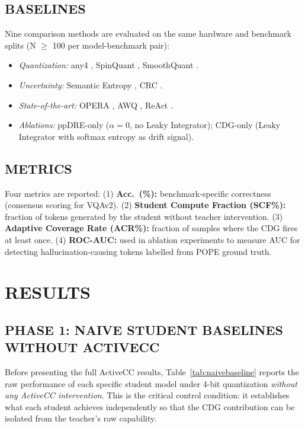 \documentclass{ieeetmlcn}
\begin{document}
\subsection{BASELINES}
Nine comparison methods are evaluated on the same hardware and benchmark
splits (N $\geq$ 100 per model-benchmark pair):
\begin{itemize}
  \item \emph{Quantization:} any4 \cite{elhoushi2025any}, SpinQuant
        \cite{liu2025spinquant}, SmoothQuant \cite{xiao2023smoothquant}.
  \item \emph{Uncertainty:} Semantic Entropy ,
        CRC \cite{angelopoulos2024conformal}.
  \item \emph{State-of-the-art:} OPERA \cite{huang2023opera}, AWQ
        \cite{lin2024awq}, ReAct \cite{yao2022react}.
  \item \emph{Ablations:} ppDRE-only ($\alpha=0$, no Leaky Integrator);
        CDG-only (Leaky Integrator with softmax entropy as drift signal).
\end{itemize}

\subsection{METRICS}
Four metrics are reported: (1) \textbf{Acc.\ (\%):} benchmark-specific correctness (consensus scoring for VQAv2). (2) \textbf{Student Compute Fraction (SCF\%):} fraction of tokens generated by the student without teacher intervention. (3) \textbf{Adaptive Coverage Rate (ACR\%):} fraction of samples where the CDG fires at least once. (4) \textbf{ROC-AUC:} used in ablation experiments to measure AUC for detecting hallucination-causing tokens labelled from POPE ground truth.

\section{RESULTS}
\label{sec:results}

\subsection{PHASE 1: NAIVE STUDENT BASELINES WITHOUT ACTIVECC}
Before presenting the full ActiveCC results, Table~\ref{tab:naivebaseline} reports the raw performance of each specific student model under 4-bit quantization \emph{without any ActiveCC intervention}. This is the critical control condition: it establishes what each student achieves independently so that the CDG contribution can be isolated from the teacher's raw capability.
\end{document}
